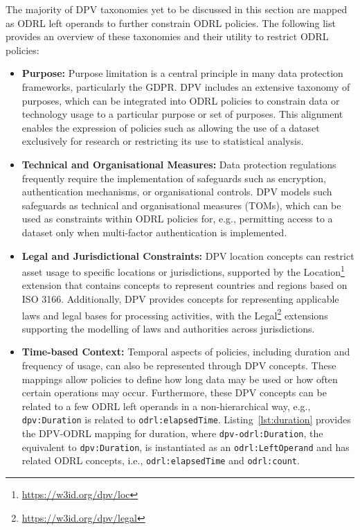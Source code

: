 The majority of DPV taxonomies yet to be discussed in this section
are mapped as ODRL left operands to further constrain ODRL policies.
The following list provides an overview of these taxonomies and
their utility to restrict ODRL policies:
\begin{itemize}
    \item \textbf{Purpose:} Purpose limitation is a central principle in many data protection frameworks, particularly the GDPR. DPV includes an extensive taxonomy of purposes, which can be integrated into ODRL policies to constrain data or technology usage to a particular purpose or set of purposes. This alignment enables the expression of policies such as allowing the use of a dataset exclusively for research or restricting its use to statistical analysis.
    \item \textbf{Technical and Organisational Measures:} Data protection regulations frequently require the implementation of safeguards such as encryption, authentication mechanisms, or organisational controls. DPV models such safeguards as technical and organisational measures (TOMs), which can be used as constraints within ODRL policies for, e.g., permitting access to a dataset only when multi-factor authentication is implemented.
    \item \textbf{Legal and Jurisdictional Constraints:} DPV location concepts can restrict asset usage to specific locations or jurisdictions, supported by the Location\footnote{\url{https://w3id.org/dpv/loc}} extension that contains concepts to represent countries and regions based on ISO 3166. Additionally, DPV provides concepts for representing applicable laws and legal bases for processing activities, with the Legal\footnote{\url{https://w3id.org/dpv/legal}} extensions supporting the modelling of laws and authorities across jurisdictions.
    \item \textbf{Time-based Context:} Temporal aspects of policies, including duration and frequency of usage, can also be represented through DPV concepts. These mappings allow policies to define how long data may be used or how often certain operations may occur. Furthermore, these DPV concepts can be related to a few ODRL left operands in a non-hierarchical way, e.g., \texttt{dpv:Duration} is related to \texttt{odrl:elapsedTime}. Listing~\ref{lst:duration} provides the DPV-ODRL mapping for duration, where \texttt{dpv-odrl:Duration}, the equivalent to \texttt{dpv:Duration}, is instantiated as an \texttt{odrl:LeftOperand} and has related ODRL concepts, i.e., \texttt{odrl:elapsedTime} and \texttt{odrl:count}.

\end{itemize}
